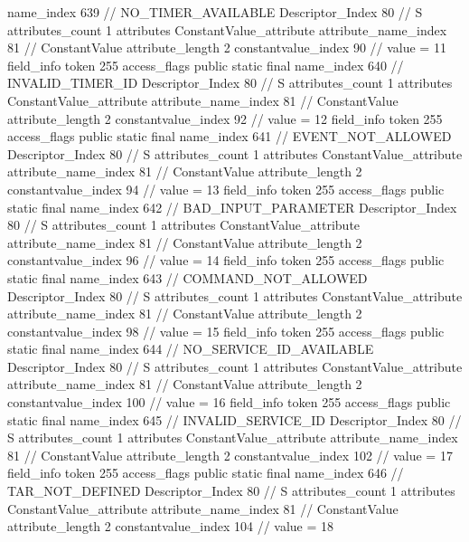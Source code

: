 {{{{{				name_index	639		// NO_TIMER_AVAILABLE
				Descriptor_Index	80		// S
				attributes_count	1
				attributes {
				ConstantValue_attribute {
					attribute_name_index	81		// ConstantValue
					attribute_length	2
					constantvalue_index	90		// value = 11
				}
				}
			}
			field_info {
				token	255
				access_flags	public static final
				name_index	640		// INVALID_TIMER_ID
				Descriptor_Index	80		// S
				attributes_count	1
				attributes {
				ConstantValue_attribute {
					attribute_name_index	81		// ConstantValue
					attribute_length	2
					constantvalue_index	92		// value = 12
				}
				}
			}
			field_info {
				token	255
				access_flags	public static final
				name_index	641		// EVENT_NOT_ALLOWED
				Descriptor_Index	80		// S
				attributes_count	1
				attributes {
				ConstantValue_attribute {
					attribute_name_index	81		// ConstantValue
					attribute_length	2
					constantvalue_index	94		// value = 13
				}
				}
			}
			field_info {
				token	255
				access_flags	public static final
				name_index	642		// BAD_INPUT_PARAMETER
				Descriptor_Index	80		// S
				attributes_count	1
				attributes {
				ConstantValue_attribute {
					attribute_name_index	81		// ConstantValue
					attribute_length	2
					constantvalue_index	96		// value = 14
				}
				}
			}
			field_info {
				token	255
				access_flags	public static final
				name_index	643		// COMMAND_NOT_ALLOWED
				Descriptor_Index	80		// S
				attributes_count	1
				attributes {
				ConstantValue_attribute {
					attribute_name_index	81		// ConstantValue
					attribute_length	2
					constantvalue_index	98		// value = 15
				}
				}
			}
			field_info {
				token	255
				access_flags	public static final
				name_index	644		// NO_SERVICE_ID_AVAILABLE
				Descriptor_Index	80		// S
				attributes_count	1
				attributes {
				ConstantValue_attribute {
					attribute_name_index	81		// ConstantValue
					attribute_length	2
					constantvalue_index	100		// value = 16
				}
				}
			}
			field_info {
				token	255
				access_flags	public static final
				name_index	645		// INVALID_SERVICE_ID
				Descriptor_Index	80		// S
				attributes_count	1
				attributes {
				ConstantValue_attribute {
					attribute_name_index	81		// ConstantValue
					attribute_length	2
					constantvalue_index	102		// value = 17
				}
				}
			}
			field_info {
				token	255
				access_flags	public static final
				name_index	646		// TAR_NOT_DEFINED
				Descriptor_Index	80		// S
				attributes_count	1
				attributes {
				ConstantValue_attribute {
					attribute_name_index	81		// ConstantValue
					attribute_length	2
					constantvalue_index	104		// value = 18
}}}}}}}
